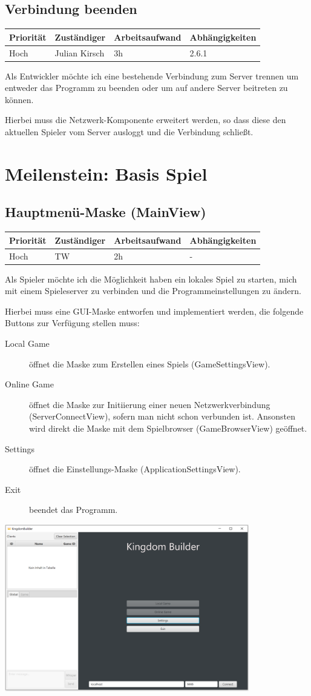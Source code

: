 \documentclass[a4paper]{scrreprt}
\newenvironment{requirement}[5] {
	\subsection{#1}
	\begin{tabularx}{\textwidth}{|X|l|X|X|}
		\hline
		Priorität & Zuständiger & Arbeitsaufwand & Abhängigkeiten \\
		\hline
		#2 & #3 & #4 & #5 \\
		\hline
	\end{tabularx}
	}{
	\newpage
	}
\begin{document}
\begin{requirement}{Verbindung beenden}{Hoch}{Julian Kirsch}{3h}{2.6.1}

\begin{center}
	Als Entwickler möchte ich eine bestehende Verbindung zum Server trennen um entweder das Programm zu beenden oder um auf andere Server beitreten zu können.
\end{center}

Hierbei muss die Netzwerk-Komponente erweitert werden, so dass diese den aktuellen Spieler vom Server ausloggt und die Verbindung schließt.

\end{requirement}


\section{Meilenstein: Basis Spiel}


\begin{requirement}{Hauptmenü-Maske (MainView)}{Hoch}{TW}{2h}{-}

\begin{center}
	Als Spieler möchte ich die Möglichkeit haben ein lokales Spiel zu starten, mich mit einem Spieleserver zu verbinden und die Programmeinstellungen zu ändern.
\end{center}


Hierbei muss eine GUI-Maske entworfen und implementiert werden, die folgende Buttons zur Verfügung stellen muss:
\begin{description}
	\item[Local Game] öffnet die Maske zum Erstellen eines Spiels (\glqq GameSettingsView\grqq{}).
	\item[Online Game] öffnet die Maske zur Initiierung einer neuen Netzwerkverbindung (\glqq ServerConnectView\grqq{}), sofern man nicht schon verbunden ist.
				Ansonsten wird direkt die Maske mit dem Spielbrowser (\glqq GameBrowserView\grqq{}) geöffnet.
	\item[Settings] öffnet die Einstellungs-Maske (\glqq ApplicationSettingsView\grqq{}).
	\item[Exit] beendet das Programm.
\end{description}

\includegraphics[width=0.8\textwidth]{view2.png}

\end{requirement}
\end{document}
